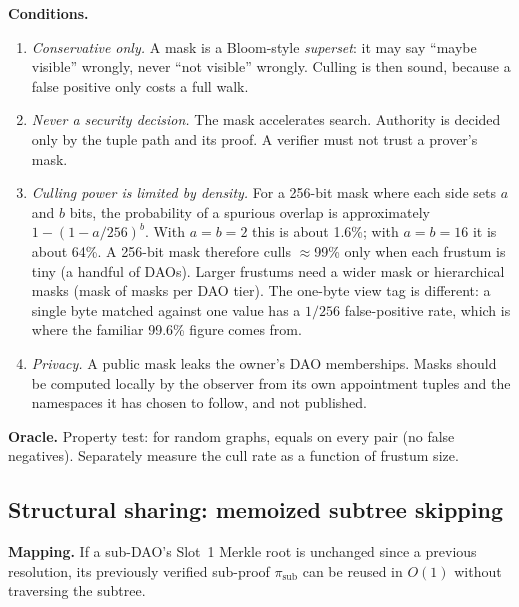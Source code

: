 \documentclass[a4paper,11pt,twoside,parskip=half-,headings=small]{scrartcl}
\begin{document}
\textbf{Conditions.}
\begin{enumerate}[nosep]
  \item \emph{Conservative only.} A mask is a Bloom-style \emph{superset}: it may say ``maybe visible'' wrongly, never ``not visible'' wrongly. Culling is then sound, because a false positive only costs a full walk.
  \item \emph{Never a security decision.} The mask accelerates search. Authority is decided only by the tuple path and its proof. A verifier must not trust a prover's mask.
  \item \emph{Culling power is limited by density.} For a 256-bit mask where each side sets $a$ and $b$ bits, the probability of a spurious overlap is approximately $1-(1-a/256)^b$. With $a=b=2$ this is about 1.6\%; with $a=b=16$ it is about 64\%.
        A 256-bit mask therefore culls $\approx$99\% only when each frustum is tiny (a handful of DAOs). Larger frustums need a wider mask or hierarchical masks (mask of masks per DAO tier). The one-byte view tag is different: a single byte matched against one value has a $1/256$ false-positive rate, which is where the familiar 99.6\% figure comes from.
  \item \emph{Privacy.} A public mask leaks the owner's DAO memberships. Masks should be computed locally by the observer from its own appointment tuples and the namespaces it has chosen to follow, and not published.
\end{enumerate}

\textbf{Oracle.} Property test: for random graphs,  equals  on every pair (no false negatives). Separately measure the cull rate as a function of frustum size.

\subsection{Structural sharing: memoized subtree skipping}

\textbf{Mapping.} If a sub-DAO's Slot~1 Merkle root is unchanged since a previous resolution, its previously verified sub-proof $\pi_{\text{sub}}$ can be reused in $O(1)$ without traversing the subtree.
\end{document}
